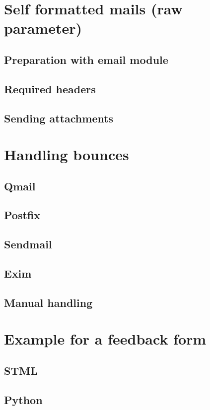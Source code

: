 \documentclass{article}
\begin{document}
\section{Self formatted mails (raw parameter)}
\subsection{Preparation with email module}
\subsection{Required headers}
\subsection{Sending attachments}

\section{Handling bounces}
\subsection{Qmail}
\subsection{Postfix}
\subsection{Sendmail}
\subsection{Exim}
\subsection{Manual handling}

\section{Example for a feedback form}
\subsection{STML}
\subsection{Python}
\end{document}

